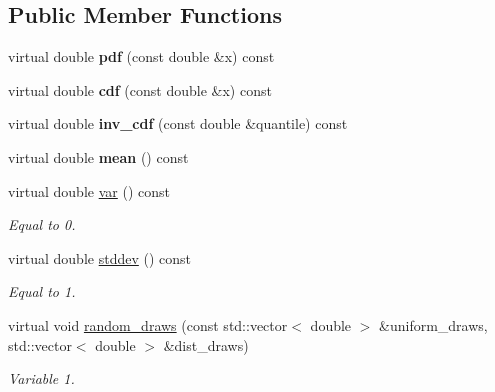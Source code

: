 \subsection*{Public Member Functions}
\begin{DoxyCompactItemize}
\item 
\mbox{\label{classStandardNormalDistribution_aa13a3e08de0d6c210f12f6b662a96797}} 
virtual double {\bfseries pdf} (const double \&x) const
\item 
\mbox{\label{classStandardNormalDistribution_a3fa7f2413b10c05cbc9e08a96d4119cc}} 
virtual double {\bfseries cdf} (const double \&x) const
\item 
\mbox{\label{classStandardNormalDistribution_a51a7b166106a8d3a8cb49a6e39fede7e}} 
virtual double {\bfseries inv\+\_\+cdf} (const double \&quantile) const
\item 
\mbox{\label{classStandardNormalDistribution_ac3a7c8dd5787428010756b1431904b53}} 
virtual double {\bfseries mean} () const
\item 
\mbox{\label{classStandardNormalDistribution_aaa5c3dbc1faee3610b3c9332301ceb97}} 
virtual double \hyperlink{classStandardNormalDistribution_aaa5c3dbc1faee3610b3c9332301ceb97}{var} () const
\begin{DoxyCompactList}\small\item\em Equal to 0. \end{DoxyCompactList}\item 
\mbox{\label{classStandardNormalDistribution_aea430178b36681c1857984339c63eba0}} 
virtual double \hyperlink{classStandardNormalDistribution_aea430178b36681c1857984339c63eba0}{stddev} () const
\begin{DoxyCompactList}\small\item\em Equal to 1. \end{DoxyCompactList}\item 
\mbox{\label{classStandardNormalDistribution_a5289fe3625483f32e0c82bafa467f20d}} 
virtual void \hyperlink{classStandardNormalDistribution_a5289fe3625483f32e0c82bafa467f20d}{random\+\_\+draws} (const std\+::vector$<$ double $>$ \&uniform\+\_\+draws, std\+::vector$<$ double $>$ \&dist\+\_\+draws)
\begin{DoxyCompactList}\small\item\em Variable 1. \end{DoxyCompactList}\end{DoxyCompactItemize}


